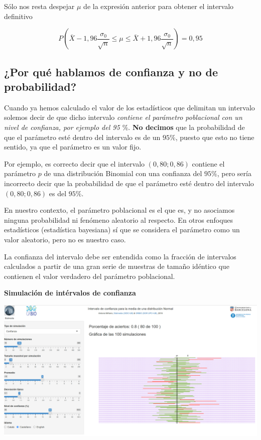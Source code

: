 \documentclass[
]{article}
\begin{document}
Sólo nos resta despejar \(\mu\) de la expresión anterior para obtener el intervalo definitivo

\[
P\left(\bar{X}-1,96 \frac{\sigma_{0}}{\sqrt{n}} \leq \mu \leq \bar{X}+1,96 \frac{\sigma_{0}}{\sqrt{n}}\right)=0,95
\]

\subsection{¿Por qué hablamos de confianza y no de probabilidad?}\label{por-quuxe9-hablamos-de-confianza-y-no-de-probabilidad}

Cuando ya hemos calculado el valor de los estadísticos que delimitan un intervalo solemos decir de que dicho intervalo \emph{contiene el parámetro poblacional con un nivel de confianza, por ejemplo del 95 \(\%\)}. \textbf{No decimos} que la probabilidad de que el parámetro esté dentro del intervalo es de un \(95 \%\), puesto que esto no tiene sentido, ya que el parámetro es un valor fijo.

Por ejemplo, es correcto decir que el intervalo \((0,80 ; 0,86)\) contiene el parámetro \(p\) de una distribución Binomial con una confianza del \(95 \%\), pero sería incorrecto decir que la probabilidad de que el parámetro esté dentro del intervalo \((0,80 ; 0,86)\) es del \(95 \%\).

En nuestro contexto, el parámetro poblacional es el que es, y no asociamos ninguna probabilidad ni fenómeno aleatorio al respecto. En otros enfoques estadísticos (estadística bayesiana) sí que se considera el parámetro como un valor aleatorio, pero no es nuestro caso.

La confianza del intervalo debe ser entendida como la fracción de intervalos calculados a partir de una gran serie de muestras de tamaño idéntico que contienen el valor verdadero del parámetro poblacional.

\textbf{Simulación de intérvalos de confianza}

\begin{center}\includegraphics[width=0.9\linewidth]{images/simulaIC} \end{center}
\end{document}
